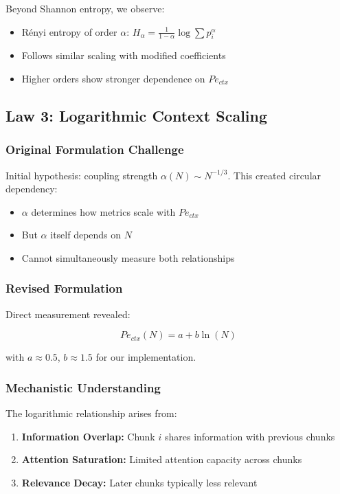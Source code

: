 \documentclass[conference]{IEEEtran}
\begin{document}
Beyond Shannon entropy, we observe:
\begin{itemize}
\item Rényi entropy of order $\alpha$: $H_\alpha = \frac{1}{1-\alpha}\log\sum p_i^\alpha$
\item Follows similar scaling with modified coefficients
\item Higher orders show stronger dependence on $Pe_{ctx}$
\end{itemize}

\subsection{Law 3: Logarithmic Context Scaling}

\subsubsection{Original Formulation Challenge}

Initial hypothesis: coupling strength $\alpha(N) \sim N^{-1/3}$. This created circular dependency:
\begin{itemize}
\item $\alpha$ determines how metrics scale with $Pe_{ctx}$
\item But $\alpha$ itself depends on $N$
\item Cannot simultaneously measure both relationships
\end{itemize}

\subsubsection{Revised Formulation}

Direct measurement revealed:

\begin{equation}
Pe_{ctx}(N) = a + b\ln(N)
\end{equation}

with $a \approx 0.5$, $b \approx 1.5$ for our implementation.

\subsubsection{Mechanistic Understanding}

The logarithmic relationship arises from:
\begin{enumerate}
\item \textbf{Information Overlap:} Chunk $i$ shares information with previous chunks
\item \textbf{Attention Saturation:} Limited attention capacity across chunks
\item \textbf{Relevance Decay:} Later chunks typically less relevant
\end{enumerate}
\end{document}
